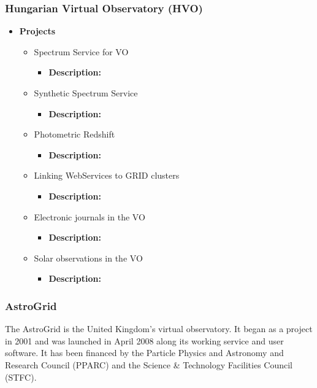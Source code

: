 \subsubsection{Hungarian Virtual Observatory (HVO)}
\begin{itemize}
\item \textbf{Projects}
\begin{itemize}
\item Spectrum Service for VO
\begin{itemize}
\item \textbf{Description:}
\end{itemize}
\item Synthetic Spectrum Service
\begin{itemize}
\item \textbf{Description:}
\end{itemize}
\item Photometric Redshift
\begin{itemize}
\item \textbf{Description:}
\end{itemize}
\item Linking WebServices to GRID clusters
\begin{itemize}
\item \textbf{Description:}
\end{itemize}
\item Electronic journals in the VO
\begin{itemize}
\item \textbf{Description:}
\end{itemize}
\item Solar observations in the VO
\begin{itemize}
\item \textbf{Description:}
\end{itemize}
\end{itemize}
\end{itemize}

\subsubsection{AstroGrid}
The AstroGrid is the United Kingdom's virtual observatory. It began as a project
in 2001 and was launched in April 2008 along its working service and user
software. It has been financed by the Particle Physics and Astronomy and
Research Council (PPARC) and the Science \& Technology Facilities Council
(STFC).

